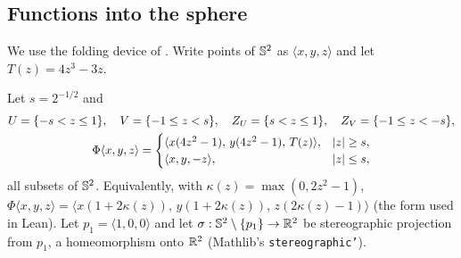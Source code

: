 \subsection{Functions into the sphere}
We use the folding device of \cite[(F)(I)]{TAMSb}. Write points of $\mathbb{S}^2$ as $\langle x,y,z\rangle$ and
let $T(z)=4z^3-3z$.

\begin{definition}\label{def:fold}
Let $s=2^{-1/2}$ and
\begin{gather*}
U=\{-s<z\le1\},\quad V=\{-1\le z<s\},\quad Z_U=\{s<z\le1\},\quad Z_V=\{-1\le z<-s\},\\
\Phi\langle x,y,z\rangle=\begin{cases}\langle x(4z^2-1),\,y(4z^2-1),\,T(z)\rangle,&\lvert z\rvert\ge s,\\
\langle x,y,-z\rangle,&\lvert z\rvert\le s,\end{cases}
\end{gather*}
all subsets of $\mathbb{S}^2$. Equivalently, with $\kappa(z)=\max(0,2z^2-1)$,
$\Phi\langle x,y,z\rangle=\langle x(1+2\kappa(z)),\,y(1+2\kappa(z)),\,z(2\kappa(z)-1)\rangle$ (the form used in Lean).
Let $p_1=\langle1,0,0\rangle$ and let $\sigma:\mathbb{S}^2\setminus\{p_1\}\to\mathbb{R}^2$ be stereographic projection from $p_1$, a
homeomorphism onto $\mathbb{R}^2$ (Mathlib's \texttt{stereographic'}).
\end{definition}

